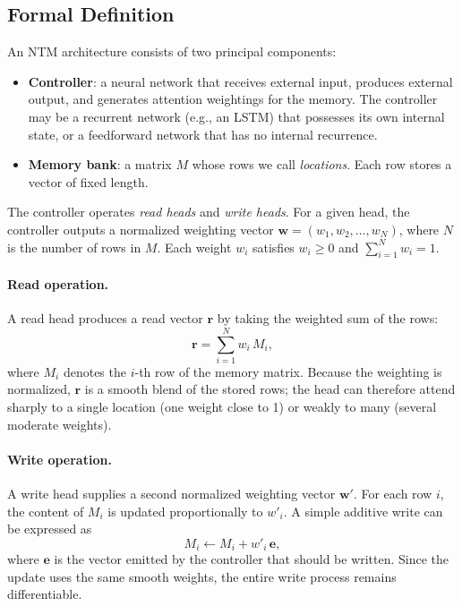 \documentclass[12pt, a4paper]{article}
\begin{document}
\subsection{Formal Definition}
An NTM architecture consists of two principal components:

\begin{itemize}
\item \textbf{Controller}: a neural network that receives external input, produces external output, and generates attention weightings for the memory. The controller may be a recurrent network (e.g., an LSTM) that possesses its own internal state, or a feedforward network that has no internal recurrence.
\item \textbf{Memory bank}: a matrix \(M\) whose rows we call \emph{locations}. Each row stores a vector of fixed length.
\end{itemize}

The controller operates \emph{read heads} and \emph{write heads}.  
For a given head, the controller outputs a normalized weighting vector \(\mathbf{w} = (w_1, w_2, \dots, w_N)\), where \(N\) is the number of rows in \(M\).  Each weight \(w_i\) satisfies \(w_i \ge 0\) and \(\sum_{i=1}^{N} w_i = 1\).  

\paragraph{Read operation.}  
A read head produces a read vector \(\mathbf{r}\) by taking the weighted sum of the rows:
\[
\mathbf{r} = \sum_{i=1}^{N} w_i \, M_{i},
\]
where \(M_{i}\) denotes the \(i\)-th row of the memory matrix.  
Because the weighting is normalized, \(\mathbf{r}\) is a smooth blend of the stored rows; the head can therefore attend sharply to a single location (one weight close to 1) or weakly to many (several moderate weights).

\paragraph{Write operation.}  
A write head supplies a second normalized weighting vector \(\mathbf{w}'\).  For each row \(i\), the content of \(M_{i}\) is updated proportionally to \(w'_i\).  A simple additive write can be expressed as
\[
M_{i} \leftarrow M_{i} + w'_i \, \mathbf{e},
\]
where \(\mathbf{e}\) is the vector emitted by the controller that should be written.  Since the update uses the same smooth weights, the entire write process remains differentiable.
\end{document}
